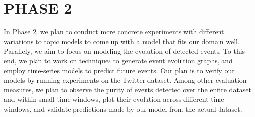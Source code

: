 \section{\uppercase{Phase 2}}
In Phase 2, we plan to conduct more concrete experiments with different variations to topic models to come up with a model that fits our domain well. Parallely, we aim to focus on modeling the evolution of detected events. To this end, we plan to work on techniques to generate event evolution graphs, and employ time-series models to predict future events. Our plan is to verify our models by running experiments on the Twitter dataset. Among other evaluation measures, we plan to observe the purity of events detected over the entire dataset and within small time windows, plot their evolution across different time windows, and validate predictions made by our model from the actual dataset.
